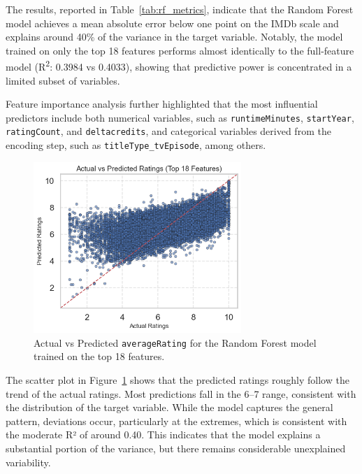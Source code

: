 The results, reported in Table~\ref{tab:rf_metrics}, indicate that the Random Forest model achieves 
a mean absolute error below one point on the IMDb scale and explains around 40\% of the variance in the target variable. 
Notably, the model trained on only the top 18 features performs almost identically to the full-feature model 
(R\textsuperscript{2}: 0.3984 vs 0.4033), showing that 
predictive power is concentrated in a limited subset of variables. 

Feature importance analysis further highlighted that the most influential predictors include both numerical variables,
such as \texttt{runtimeMinutes}, \texttt{startYear}, \texttt{ratingCount}, and \texttt{deltacredits},
and categorical variables derived from the encoding step, such as \texttt{titleType\_tvEpisode}, among others. 

\begin{figure}[h]
\centering
\includegraphics[width=0.7\textwidth]{plotsss/rf_top18_actual_vs_predicted.png} 
\caption{Actual vs Predicted \texttt{averageRating} for the Random Forest model trained on the top 18 features.}
\label{fig:rf_top18_actual_vs_predicted}
\end{figure}


The scatter plot in Figure~\ref{fig:rf_top18_actual_vs_predicted} shows that the predicted ratings roughly follow the trend of 
the actual ratings. Most predictions fall in the 6–7 range, consistent with the distribution of the target variable. 
While the model captures the general pattern, deviations occur, particularly at the extremes, which is consistent with the moderate R² of around 0.40. 
This indicates that the model explains a substantial portion of the variance, but there remains considerable unexplained variability.

